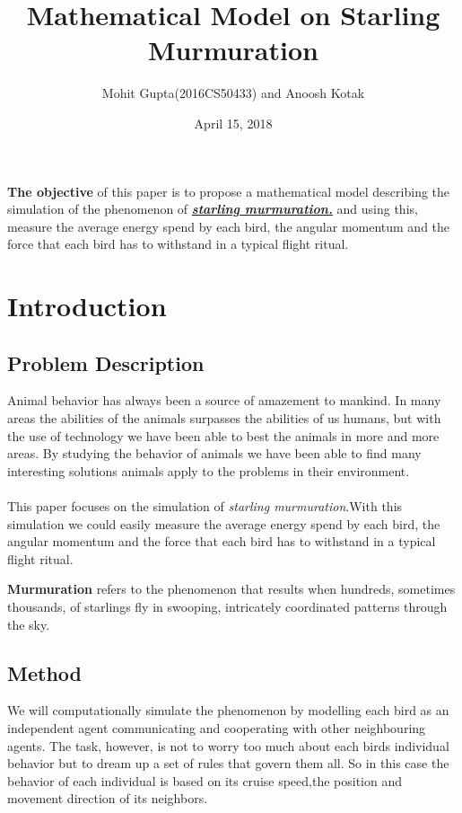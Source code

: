 \documentclass[12pt]{article}
\title{Mathematical Model on Starling Murmuration}
\author{Mohit Gupta(2016CS50433) and Anoosh Kotak }
\date{April 15, 2018}
\begin{document}
\maketitle



\textbf{The objective} of this paper is to propose a mathematical model describing the simulation of the phenomenon of \textbf{\textit{\underline{starling murmuration.}}} and using this, measure the average energy spend by each bird, the angular momentum and the force that each bird has to withstand in a typical flight ritual.



\section{Introduction}
\subsection{Problem Description}
Animal behavior has always been a source of amazement to mankind. In many
areas the abilities of the animals surpasses the abilities of us humans, but with the
use of technology we have been able to best the animals in more and more areas.
By studying the behavior of animals we have been able to find many interesting
solutions animals apply to the problems in their environment.
\paragraph{}

This paper focuses on the simulation of \emph{starling murmuration}.With this simulation we could easily measure the average energy spend by each bird, the angular momentum and the force that each bird has to withstand in a typical flight ritual.
\bigskip

\textbf{Murmuration} refers to the phenomenon that results when hundreds, sometimes thousands, of starlings fly in swooping, intricately coordinated patterns through the sky.
\pagebreak

\subsection{Method}
We will computationally simulate the phenomenon by modelling each bird as an independent agent communicating and cooperating with other neighbouring agents.  The task, however, is not to worry too much about each birds individual behavior but to dream up a set of rules that govern them all.  So in this case the behavior of each individual is based on its cruise speed,the  position  and  movement  direction  of  its neighbors.
\end{document}
